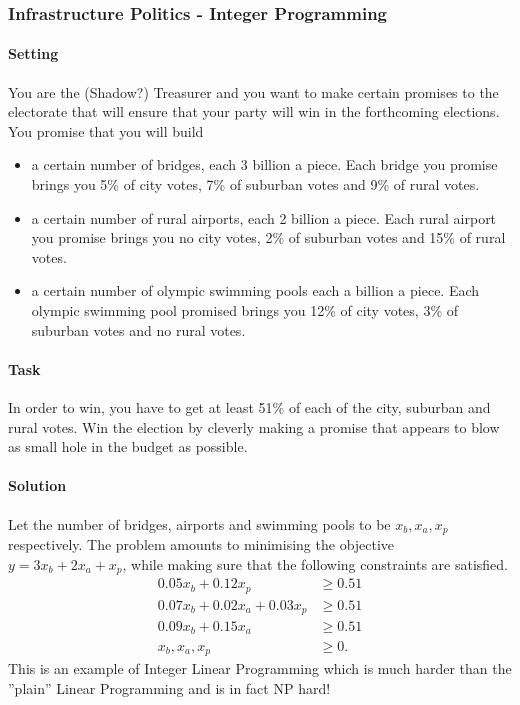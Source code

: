 \subsubsection{Infrastructure Politics - Integer Programming}
\paragraph{Setting} 
You are the (Shadow?) Treasurer and you want to make certain promises to the electorate that will ensure that your party will win in the forthcoming elections. You promise that you will build 
\begin{itemize}
    \item a certain number of bridges, each 3 billion a piece. Each bridge you promise brings you 5\% of city votes, 7\% of suburban votes and 9\% of rural votes.
    \item a certain number of rural airports, each 2 billion a piece. Each rural airport you promise brings you no city votes, 2\% of suburban votes and 15\% of rural votes.
    \item a certain number of olympic swimming pools each a billion a piece. Each olympic swimming pool promised brings you 12\% of city votes, 3\% of suburban votes and no rural votes.
\end{itemize}

\paragraph{Task} 
In order to win, you have to get at least 51\% of each of the city, suburban and rural votes. Win the election by cleverly making a promise that appears to blow as small hole in the budget as possible. 

\paragraph{Solution}
Let the number of bridges, airports and swimming pools to be \(x_b, x_a, x_p\) respectively.
The problem amounts to minimising the objective \(y = 3x_b + 2x_a + x_p\), while making sure that the following constraints are satisfied. 
\begin{align*}
    0.05 x_b + 0.12x_p & \geq 0.51 \tag{securing majority of city votes} \\
    0.07 x_b + 0.02x_a + 0.03x_p & \geq 0.51 \tag{securing majority of suburban votes} \\ 
    0.09 x_b + 0.15x_a & \geq 0.51 \tag{securing majority of rural votes} \\
    x_b, x_a, x_p & \geq 0. 
\end{align*}
This is an example of Integer Linear Programming which is much harder than the ''plain'' Linear Programming and is in fact NP hard!


